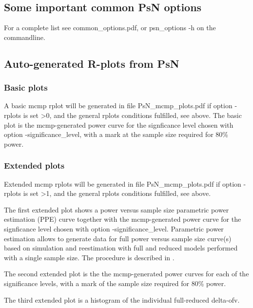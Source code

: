 \subsection{Some important common PsN options}
For a complete list see common\_options.pdf, 
or psn\_options -h on the commandline.


\subsection{Auto-generated R-plots from PsN}
\newcommand{\rplotsconditions}{The default mcmp template 
requires the R libraries ggplot2 and plyr.
If the packages are not installed no pdf will be generated,
see the .Rout file in the main run directory for error messages.}


\subsubsection*{Basic plots}
A basic mcmp rplot will be generated in file PsN\_mcmp\_plots.pdf if option -rplots is set >0,
and the general rplots conditions fulfilled, see above.
The basic plot is the mcmp-generated power curve for
the signficance level chosen with option -significance\_level, with a mark at the sample size 
required for 80\% power.
\subsubsection*{Extended plots}
Extended mcmp rplots will be generated in file PsN\_mcmp\_plots.pdf if option -rplots is set >1,
and the general rplots conditions fulfilled, see above.

The first extended plot shows a power versus sample size
parametric power estimation (PPE) curve 
together with the mcmp-generated power curve for
the signficance level chosen with option -significance\_level.
Parametric power estimation allows to generate data for full power
versus sample size curve(s) 
based on simulation and reestimation
with full and reduced models performed with a single sample size.
The procedure is described in \cite{Ueckert}. 

The second extended plot is the the mcmp-generated power curves for
each of the significance levels, with a mark of the sample size 
required for 80\% power.

The third extended plot is a histogram of the individual full-reduced delta-ofv. 

